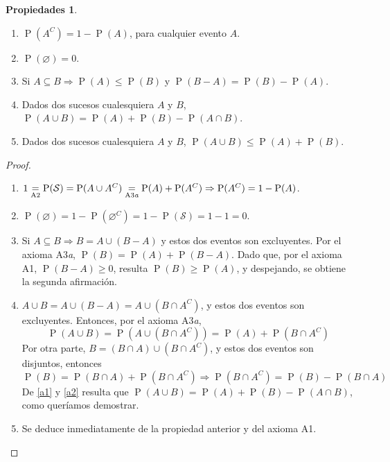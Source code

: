 \documentclass[11pt]{article}
\theoremstyle{plain}
\theoremstyle{definition}
\newtheorem*{props}{Propiedades}
\theoremstyle{remark}
\newcommand{\proba}{\ensuremath{\operatorname{P}}}  %
\newcommand{\espm}[0]{\ensuremath{\mathcal{S}}}  %
\begin{document}
  \begin{props} \ 
    \begin{enumerate}
      \item $\proba(A^C) = 1 - \proba(A)$, para cualquier evento $A$.

      \item $\proba(\varnothing) = 0$.

      \item Si $A \subseteq B \Rightarrow \proba(A) \leq \proba(B)$ y $\proba(B - A) = \proba(B) - \proba(A)$.

      \item Dados dos sucesos cualesquiera $A$ y $B$, $\proba(A \cup B) = \proba(A) + \proba(B) - \proba(A \cap B)$.

      \item Dados dos sucesos cualesquiera $A$ y $B$, $\proba(A \cup B) \leq \proba(A) + \proba(B)$.
    \end{enumerate}
  \end{props}

  \begin{proof} \ 
    \begin{enumerate}
      \item $1 \underset{\text{A2}}{=} \proba(\espm) = \proba(A \cup A^C) \underset{\text{A3\textit{a}}}{=} \proba(A) + \proba(A^C) \Rightarrow \proba(A^C) = 1 - \proba(A)$.

      \item $\proba(\varnothing) = 1 - \proba(\varnothing^C) = 1 - \proba(\espm) = 1 - 1 = 0$.

      \item Si $A \subseteq B \Rightarrow B = A \cup (B - A)$ y estos dos eventos son excluyentes. Por el axioma A3\textit{a}, $\proba(B) = \proba(A) + \proba(B - A)$. Dado que, por el axioma A1, $\proba(B - A) \geq 0$, resulta $\proba(B) \geq \proba(A)$, y despejando, se obtiene la segunda afirmación.

      \item $A \cup B = A \cup (B - A) = A \cup (B \cap A^C)$, y estos dos eventos son excluyentes. Entonces, por el axioma A3\textit{a},
        \begin{equation} \label{a1} \proba(A \cup B) = \proba(A \cup (B \cap A^C)) = \proba(A) + \proba(B \cap A^C) \end{equation}
        Por otra parte, $B = (B \cap A) \cup (B \cap A^C)$, y estos dos eventos son disjuntos, entonces
        \begin{equation} \label{a2} \proba(B) = \proba(B \cap A) + \proba(B \cap A^C) \Rightarrow \proba(B \cap A^C) = \proba(B) - \proba(B \cap A) \end{equation}
        De \eqref{a1} y \eqref{a2} resulta que $\proba(A \cup B) = \proba(A) + \proba (B) - \proba(A \cap B)$, como queríamos demostrar.

      \item Se deduce inmediatamente de la propiedad anterior y del axioma A1. \qedhere
    \end{enumerate}
  \end{proof}
\end{document}
